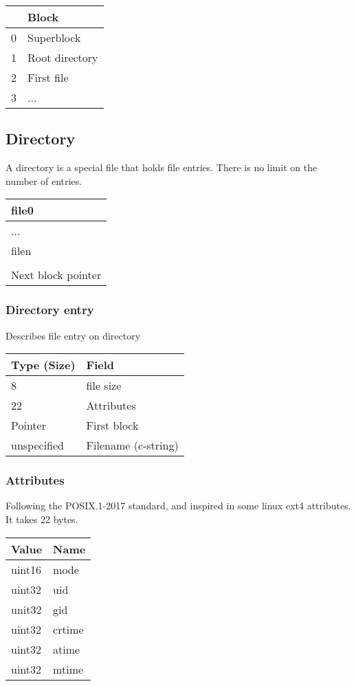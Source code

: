 \documentclass[]{article}
\begin{document}
	\begin{tabular}{|l|l|} 
		\hline
		 & \textbf{Block} \\ [0.5ex] 
		\hline
		0 & Superblock \\
		\hline
		1 & Root directory \\
		\hline
		2 & First file \\
		\hline
		3 & ... \\
		\hline
	\end{tabular}

	\subsection{Directory}
	
	A directory is a special file that holds file entries. There is no limit on the number of entries.
	
	\begin{tabular}{|l|} 
		\hline
		file0 \\ 
		\hline
		... \\
		\hline
		filen \\
		\hline
		[Padding] \\
		\hline
		Next block pointer \\
		\hline
	\end{tabular}

	\subsubsection{Directory entry}
	Describes file entry on directory

	\begin{tabular}{|l|l|} 
		\hline
		\textbf{Type (Size)} & \textbf{Field} \\ [0.5ex] 
		\hline
		8 & file size \\
		\hline
		22 & Attributes \\
		\hline
		Pointer & First block \\
		\hline
		unspecified & Filename (c-string) \\
		\hline
	\end{tabular}

	\subsubsection{Attributes}
	Following the POSIX.1-2017 standard, and inspired in some linux ext4 attributes. It takes 22 bytes.
	
	\begin{tabular}{|l|l|} 
		\hline
		\textbf{Value} & \textbf{Name} \\ [0.5ex] 
		\hline
		uint16 & mode \\
		\hline
		uint32 & uid \\
		\hline
		unit32 & gid \\
		\hline
		uint32 & crtime \\
		\hline
		uint32 & atime \\
		\hline
		uint32 & mtime \\
		\hline
	\end{tabular}
\end{document}
